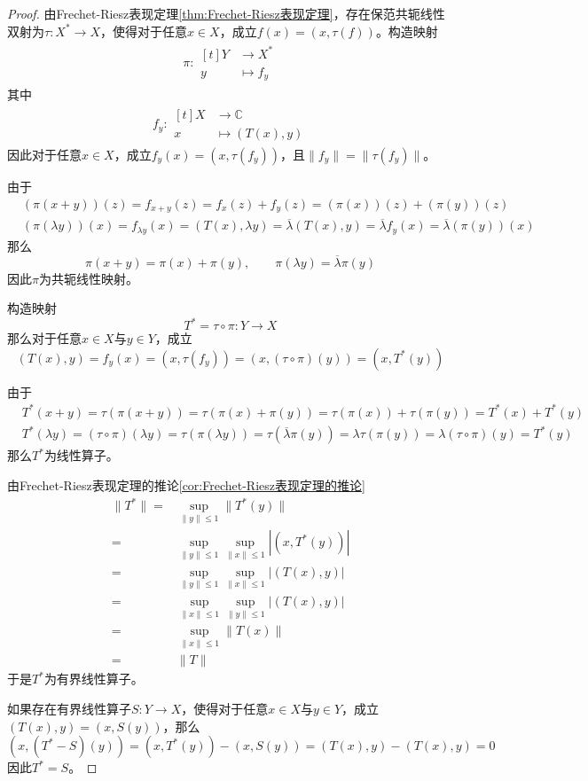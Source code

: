 \documentclass[lang = cn, scheme = chinese, thmcnt = section]{elegantbook}
\newcommand{\C}{\mathbb{C}}  		   %
\begin{document}
\begin{proof}
	由Frechet-Riesz表现定理\ref{thm:Frechet-Riesz表现定理}，存在保范共轭线性双射为$\tau:X^*\to X$，使得对于任意$x\in X$，成立$f(x)=(x,\tau(f))$。构造映射
	\begin{align*}
		\pi:\begin{aligned}[t]
			Y&\longrightarrow X^*\\
			y&\longmapsto f_y
		\end{aligned}
	\end{align*}
	其中
	\begin{align*}
		f_y:\begin{aligned}[t]
			X&\longrightarrow \C\\
			x&\longmapsto (T(x),y)
		\end{aligned}
	\end{align*}
	因此对于任意$x\in X$，成立$f_y(x)=(x,\tau(f_y))$，且$\|f_y\|=\|\tau(f_y)\|$。
	
	由于
	\begin{align*}
		&(\pi(x+y))(z)=f_{x+y}(z)=f_x(z)+f_y(z)=(\pi(x))(z)+(\pi(y))(z)\\
		&(\pi(\lambda y))(x)=f_{\lambda y}(x)=(T(x),\lambda y)=\overline{\lambda}(T(x),y)=\overline{\lambda}f_y(x)=\overline{\lambda}(\pi(y))(x)
	\end{align*}
	那么
	$$
	\pi(x+y)=\pi(x)+\pi(y),\qquad 
	\pi(\lambda y)=\overline{\lambda}\pi(y)
	$$
	因此$\pi$为共轭线性映射。
	
	构造映射
	$$
	T^*=\tau\circ \pi:Y\to X
	$$
	那么对于任意$x\in X$与$y\in Y$，成立
	$$
	(T(x),y)=f_y(x)=(x,\tau(f_y))=(x,(\tau\circ \pi)(y))=(x,T^*(y))
	$$
	
	由于
	\begin{align*}
		&T^*(x+y)=\tau(\pi(x+y))=\tau(\pi(x)+\pi(y))=\tau(\pi(x))+\tau(\pi(y))=T^*(x)+T^*(y)\\
		&T^*(\lambda y)=(\tau\circ \pi)(\lambda y)=\tau(\pi(\lambda y))=\tau(\overline{\lambda}\pi(y))=\lambda \tau(\pi(y))=\lambda (\tau\circ \pi)(y)=T^*(y)
	\end{align*}
	那么$T^*$为线性算子。
	
	由Frechet-Riesz表现定理的推论\ref{cor:Frechet-Riesz表现定理的推论}
	\begin{align*}
		\|T^*\| = & \sup_{\|y\|\le 1}\|T^*(y)\|\\
		= & \sup_{\|y\|\le 1}\sup_{\|x\|\le 1}|(x,T^*(y))|\\
		= & \sup_{\|y\|\le 1}\sup_{\|x\|\le 1}|(T(x),y)|\\
		= & \sup_{\|x\|\le 1}\sup_{\|y\|\le 1}|(T(x),y)|\\
		= & \sup_{\|x\|\le 1}\|T(x)\|\\
		= & \|T\|
	\end{align*}
	于是$T^*$为有界线性算子。
	
	如果存在有界线性算子$S:Y\to X$，使得对于任意$x\in X$与$y\in Y$，成立$(T(x),y)=(x,S(y))$，那么
	$$
	(x,(T^*-S)(y))=(x,T^*(y))-(x,S(y))=(T(x),y)-(T(x),y)=0
	$$
	因此$T^*=S$。
\end{proof}
\end{document}
